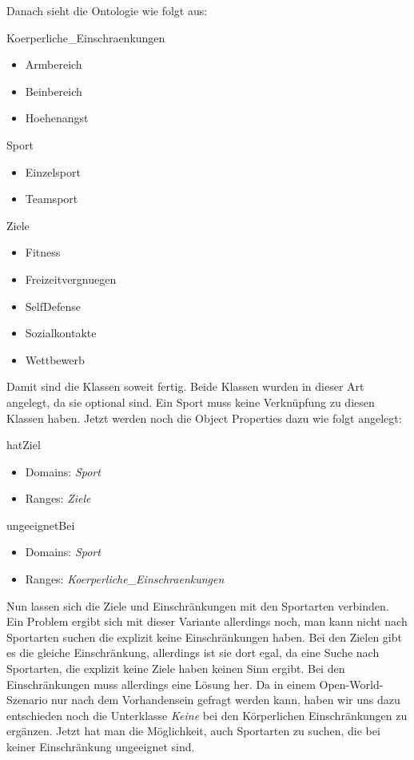 Danach sieht die Ontologie wie folgt aus:
\begin{capitemize}
	\item Koerperliche\_Einschraenkungen
		\begin{itemize}
				\item Armbereich
				\item Beinbereich
				\item Hoehenangst
		\end{itemize}
	\item Sport
		\begin{itemize}
			\item Einzelsport
			\item Teamsport
		\end{itemize}
	\item Ziele
		\begin{itemize}
				\item Fitness
				\item Freizeitvergnuegen
				\item SelfDefense
				\item Sozialkontakte
				\item Wettbewerb
		\end{itemize}
\end{capitemize}

Damit sind die Klassen soweit fertig. Beide Klassen wurden in dieser Art angelegt, da sie optional sind. Ein Sport muss keine Verknüpfung zu diesen Klassen haben. Jetzt werden noch die Object Properties dazu wie folgt angelegt:

\begin{capitemize}
	\item hatZiel
		\begin{itemize}
			\item Domains: \textit{Sport}
			\item Ranges: \textit{Ziele}
		\end{itemize}
	\item ungeeignetBei
		\begin{itemize}
			\item Domains: \textit{Sport}
			\item Ranges: \textit{Koerperliche\_Einschraenkungen}
		\end{itemize}
\end{capitemize}

Nun lassen sich die Ziele und Einschränkungen mit den Sportarten verbinden. Ein Problem ergibt sich mit dieser Variante allerdings noch, man kann nicht nach Sportarten suchen die explizit keine Einschränkungen haben. Bei den Zielen gibt es die gleiche Einschränkung, allerdings ist sie dort egal, da eine Suche nach Sportarten, die explizit keine Ziele haben keinen Sinn ergibt. Bei den Einschränkungen muss allerdings eine Lösung her. Da in einem Open-World-Szenario nur nach dem Vorhandensein gefragt werden kann, haben wir uns dazu entschieden noch die Unterklasse \textit{Keine} bei den Körperlichen Einschränkungen zu ergänzen. Jetzt hat man die Möglichkeit, auch Sportarten zu suchen, die bei keiner Einschränkung ungeeignet sind.

